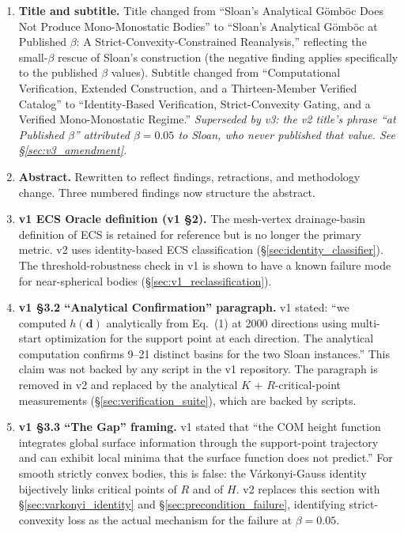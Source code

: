 \documentclass[11pt,a4paper]{article}
\begin{document}
\begin{enumerate}[nosep,leftmargin=*]
\item \textbf{Title and subtitle.} Title changed from ``Sloan's
  Analytical G\"omb\"oc Does Not Produce Mono-Monostatic Bodies''
  to ``Sloan's Analytical G\"omb\"oc at Published $\beta$: A
  Strict-Convexity-Constrained Reanalysis,'' reflecting the
  small-$\beta$ rescue of Sloan's construction (the negative finding
  applies specifically to the published $\beta$ values). Subtitle
  changed from ``Computational Verification, Extended Construction,
  and a Thirteen-Member Verified Catalog'' to ``Identity-Based
  Verification, Strict-Convexity Gating, and a Verified
  Mono-Monostatic Regime.''
  \emph{Superseded by v3: the v2 title's phrase ``at Published
  $\beta$'' attributed $\beta = 0.05$ to Sloan, who never published
  that value. See \S\ref{sec:v3_amendment}.}

\item \textbf{Abstract.} Rewritten to reflect findings, retractions,
  and methodology change. Three numbered findings now structure the
  abstract.

\item \textbf{v1 ECS Oracle definition (v1 \S 2).} The mesh-vertex
  drainage-basin definition of ECS is retained for reference but
  is no longer the primary metric. v2 uses identity-based ECS
  classification (\S\ref{sec:identity_classifier}). The
  threshold-robustness check in v1 is shown to have a known
  failure mode for near-spherical bodies (\S\ref{sec:v1_reclassification}).

\item \textbf{v1 \S 3.2 ``Analytical Confirmation'' paragraph.}
  v1 stated: ``we computed $h(\mathbf{d})$ analytically from
  Eq.~(1) at 2000 directions using multi-start optimization for
  the support point at each direction. The analytical computation
  confirms 9--21 distinct basins for the two Sloan instances.''
  This claim was not backed by any script in the v1 repository.
  The paragraph is removed in v2 and replaced by the analytical
  $K$ + $R$-critical-point measurements (\S\ref{sec:verification_suite}),
  which are backed by scripts.

\item \textbf{v1 \S 3.3 ``The Gap'' framing.} v1 stated that ``the
  COM height function integrates global surface information through
  the support-point trajectory and can exhibit local minima that
  the surface function does not predict.'' For smooth strictly
  convex bodies, this is false: the V\'arkonyi-Gauss identity
  bijectively links critical points of $R$ and of $H$. v2 replaces
  this section with \S\ref{sec:varkonyi_identity} and
  \S\ref{sec:precondition_failure}, identifying strict-convexity
  loss as the actual mechanism for the failure at $\beta = 0.05$.


\end{enumerate}
\end{document}
